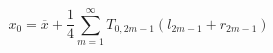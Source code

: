\begin{equation}
	x_{0}=\overline{x}+\frac{1}{4}\sum^{\infty}_{m=1}T_{0,2m-1}(l_{2m-1}+r_{2m-1})
\end{equation}

